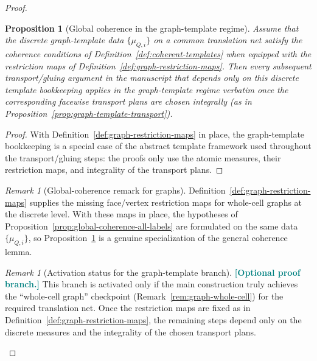 \documentclass[11pt]{article}
\newcommand{\REVMZ}[1]{\textcolor{teal}{#1}}  %
\numberwithin{equation}{section}  %
\theoremstyle{plain}
\newtheorem{proposition}[theorem]{Proposition}
\theoremstyle{definition}
\theoremstyle{remark}
\newtheorem{remark}[theorem]{Remark}
\begin{document}
\begin{proof}
%
\begin{proposition}[Global coherence in the graph-template regime]\label{prop:graph-global-coherence}
Assume that the discrete graph-template data $\{\mu_{Q,i}\}$ on a common translation net satisfy the coherence conditions of
Definition~\ref{def:coherent-templates} when equipped with the restriction maps of Definition~\ref{def:graph-restriction-maps}.
Then every subsequent transport/gluing argument in the manuscript that depends only on this discrete template bookkeeping
applies in the graph-template regime \emph{verbatim} once the corresponding facewise transport plans are chosen integrally
(as in Proposition~\ref{prop:graph-template-transport}).
\end{proposition}

\begin{proof}
With Definition~\ref{def:graph-restriction-maps} in place, the graph-template bookkeeping is a special case of the abstract
template framework used throughout the transport/gluing steps: the proofs only use the atomic measures, their restriction maps,
and integrality of the transport plans.
\end{proof}


%
\begin{remark}[Global-coherence remark for graphs]\label{rem:graph-global-coherence}
Definition~\ref{def:graph-restriction-maps} supplies the missing face/vertex restriction maps for whole-cell graphs at the discrete level.
With these maps in place, the hypotheses of Proposition~\ref{prop:global-coherence-all-labels} are formulated on the same data
$\{\mu_{Q,i}\}$, so Proposition~\ref{prop:graph-global-coherence} is a genuine specialization of the general coherence lemma.
\end{remark}


%
\begin{remark}[Activation status for the graph-template branch]\label{rem:graph-activation}
\REVMZ{\textbf{[Optional proof branch.]}}
This branch is activated only if the main construction truly achieves the ``whole-cell graph'' checkpoint (Remark~\ref{rem:graph-whole-cell})
for the required translation net.  Once the restriction maps are fixed as in Definition~\ref{def:graph-restriction-maps}, the remaining steps
depend only on the discrete measures and the integrality of the chosen transport plans.
\end{remark}


\end{proof}
\end{document}
